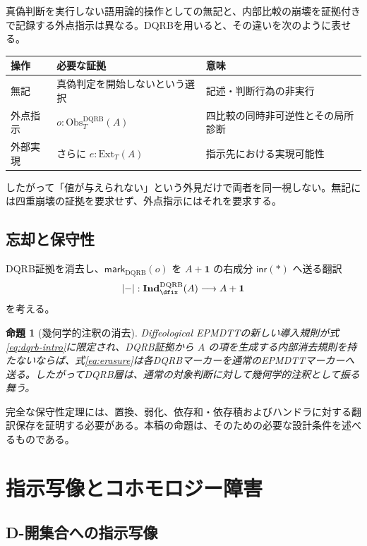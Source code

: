 \documentclass[a4paper,11pt]{ltjsarticle}
\theoremstyle{definition}
\theoremstyle{plain}
\newtheorem{proposition}[definition]{命題}
\newcommand{\DQRB}{\mathrm{DQRB}}
\newcommand{\Obs}{\mathrm{Obs}}
\newcommand{\Ext}{\mathrm{Ext}}
\newcommand{\IndD}{\mathbf{Ind}^{\DQRB}_{\dfix}}
\newcommand{\Unit}{\mathbf 1}
\begin{document}
真偽判断を実行しない語用論的操作としての無記と、内部比較の崩壊を証拠付きで記録する外点指示は異なる。DQRBを用いると、その違いを次のように表せる。

\begin{center}
\begin{tabular}{p{} p{} p{}}
\toprule
操作 & 必要な証拠 & 意味 \\
\midrule
無記 & 真偽判定を開始しないという選択 & 記述・判断行為の非実行 \\
外点指示 & $o:\Obs_T^{\DQRB}(A)$ & 四比較の同時非可逆性とその局所診断 \\
外部実現 & さらに $e:\Ext_T(A)$ & 指示先における実現可能性 \\
\bottomrule
\end{tabular}
\end{center}

したがって「値が与えられない」という外見だけで両者を同一視しない。無記には四重崩壊の証拠を要求せず、外点指示にはそれを要求する。

\subsection{忘却と保守性}

DQRB証拠を消去し、$\mathsf{mark}_{\DQRB}(o)$ を $A+\Unit$ の右成分 $\mathsf{inr}(*)$ へ送る翻訳
\begin{equation}
 |{-}|:\IndD(A)\longrightarrow A+\Unit
 \label{eq:erasure}
\end{equation}
を考える。

\begin{proposition}[幾何学的注釈の消去]
Diffeological EPMDTTの新しい導入規則が式\eqref{eq:dqrb-intro}に限定され、DQRB証拠から $A$ の項を生成する内部消去規則を持たないならば、式\eqref{eq:erasure}は各DQRBマーカーを通常のEPMDTTマーカーへ送る。したがってDQRB層は、通常の対象判断に対して幾何学的注釈として振る舞う。
\end{proposition}

完全な保守性定理には、置換、弱化、依存和・依存積およびハンドラに対する翻訳保存を証明する必要がある。本稿の命題は、そのための必要な設計条件を述べるものである。

\section{指示写像とコホモロジー障害}

\subsection{D-開集合への指示写像}
\end{document}
